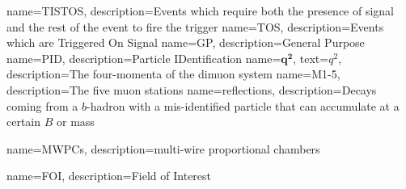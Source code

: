 {
	name=TISTOS,
		description={Events which require both the presence of signal and the rest of the event to fire the trigger}
}                                    
{
	name=TOS,
		description={Events which are Triggered On Signal}
}                                    
{
	name=GP,
		description={General Purpose}                                 }                  
{
	name=PID,
		description={Particle IDentification} 
}                 
{
	name=$\mathbold{q^{2}}$,
		text=$q^{2}$,
		description={The four-momenta of the dimuon system}
}
{
	name=M1-5,
		description={The five muon stations}
}
{
	name=reflections,
		description={Decays coming from a $b$-hadron with a mis-identified particle that can accumulate at a certain $B$ or \Lb mass}
}

{
	name=MWPCs,
		description={multi-wire proportional chambers}
}


{
	name=FOI,
		description={Field of Interest}
}


